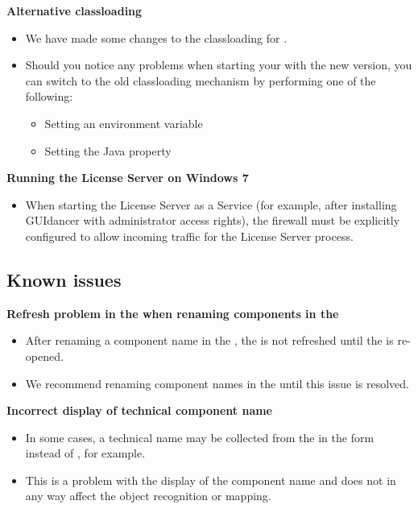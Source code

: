 \textbf{Alternative classloading}
\begin{itemize}
\item We have made some changes to the classloading for \gdauts{}.
\item Should you notice any problems when starting your \gdauts{} with the new version, you can switch to the old classloading mechanism by performing one of the following:
\begin{itemize}
\item Setting an environment variable 
\item Setting the Java property 
\end{itemize}
\end{itemize}

\textbf{Running the License Server on Windows 7}
\begin{itemize}
\item When starting the License Server as a Service (for example, after installing GUIdancer with administrator access rights), the firewall must be explicitly configured to allow incoming traffic for the License Server process. 
\end{itemize}

\subsection{Known issues}
\textbf{Refresh problem in the \gdcompnamebrowser{} when renaming components in the \gdomeditor{}}
\begin{itemize}
\item After renaming a component name in the \gdomeditor{}, the \gdcompnamebrowser{} is not refreshed until the \gdproject{} is re-opened. 
\item We recommend renaming component names in the \gdcompnamebrowser{} until this issue is resolved. 
\end{itemize}

\textbf{Incorrect display of technical component name}
\begin{itemize}
\item In some cases, a technical name may be collected from the \gdaut{} in the form  instead of , for example. 
\item This is a problem with the display of the component name and does not in any way affect the object recognition or mapping.
\end{itemize}

